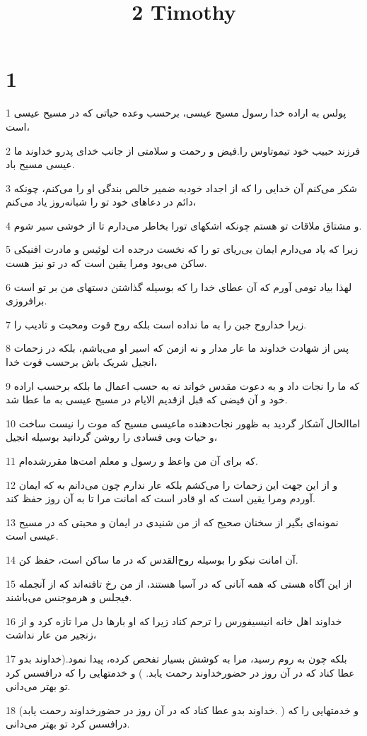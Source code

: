 

\title{2 Timothy}


\chapter{1}

\par 1 پولس به اراده خدا رسول مسیح عیسی، برحسب وعده حیاتی که در مسیح عیسی است،
\par 2 فرزند حبیب خود تیموتاوس را.فیض و رحمت و سلامتی از جانب خدای پدرو خداوند ما عیسی مسیح باد.
\par 3 شکر می‌کنم آن خدایی را که از اجداد خودبه ضمیر خالص بندگی او را می‌کنم، چونکه دائم در دعاهای خود تو را شبانه‌روز یاد می‌کنم،
\par 4 و مشتاق ملاقات تو هستم چونکه اشکهای تورا بخاطر می‌دارم تا از خوشی سیر شوم.
\par 5 زیرا که یاد می‌دارم ایمان بی‌ریای تو را که نخست درجده ات لوئیس و مادرت افنیکی ساکن می‌بود ومرا یقین است که در تو نیز هست.
\par 6 لهذا بیاد تومی آورم که آن عطای خدا را که بوسیله گذاشتن دستهای من بر تو است برافروزی.
\par 7 زیرا خداروح جبن را به ما نداده است بلکه روح قوت ومحبت و تادیب را.
\par 8 پس از شهادت خداوند ما عار مدار و نه ازمن که اسیر او می‌باشم، بلکه در زحمات انجیل شریک باش برحسب قوت خدا،
\par 9 که ما را نجات داد و به دعوت مقدس خواند نه به حسب اعمال ما بلکه برحسب اراده خود و آن فیضی که قبل ازقدیم الایام در مسیح عیسی به ما عطا شد.
\par 10 اماالحال آشکار گردید به ظهور نجات‌دهنده ماعیسی مسیح که موت را نیست ساخت و حیات وبی فسادی را روشن گردانید بوسیله انجیل،
\par 11 که برای آن من واعظ و رسول و معلم امت‌ها مقررشده‌ام.
\par 12 و از این جهت این زحمات را می‌کشم بلکه عار ندارم چون می‌دانم به که ایمان آوردم ومرا یقین است که او قادر است که امانت مرا تا به آن روز حفظ کند.
\par 13 نمونه‌ای بگیر از سخنان صحیح که از من شنیدی در ایمان و محبتی که در مسیح عیسی است.
\par 14 آن امانت نیکو را بوسیله روح‌القدس که در ما ساکن است، حفظ کن.
\par 15 از این آگاه هستی که همه آنانی که در آسیا هستند، از من رخ تافته‌اند که از آنجمله فیجلس و هرموجنس می‌باشند.
\par 16 خداوند اهل خانه انیسیفورس را ترحم کناد زیرا که او بارها دل مرا تازه کرد و از زنجیر من عار نداشت،
\par 17 بلکه چون به روم رسید، مرا به کوشش بسیار تفحص کرده، پیدا نمود.(خداوند بدو عطا کناد که در آن روز در حضورخداوند رحمت یابد. ) و خدمتهایی را که درافسس کرد تو بهتر می‌دانی.
\par 18 (خداوند بدو عطا کناد که در آن روز در حضورخداوند رحمت یابد. ) و خدمتهایی را که درافسس کرد تو بهتر می‌دانی.

